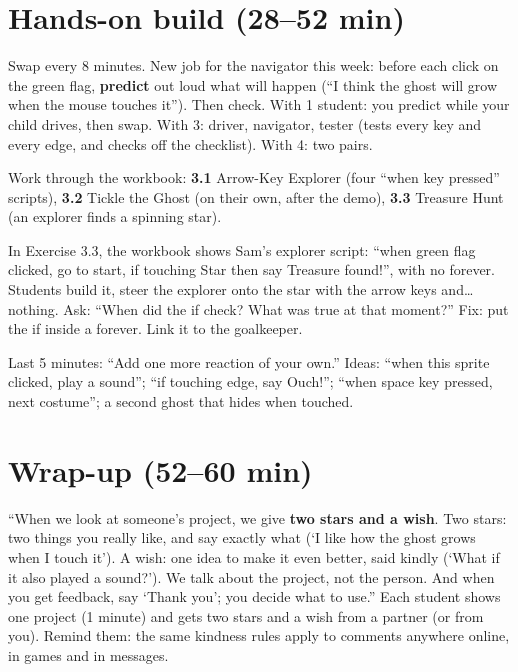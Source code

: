 \section{Hands-on build (28--52 min)}
\begin{pairroles}
Swap every 8 minutes. New job for the navigator this week: before each click on the green flag, \textbf{predict} out loud what will happen (\enquote{I think the ghost will grow when the mouse touches it}). Then check. With 1 student: you predict while your child drives, then swap. With 3: driver, navigator, tester (tests every key and every edge, and checks off the checklist). With 4: two pairs.
\end{pairroles}

Work through the workbook: \textbf{3.1} Arrow-Key Explorer (four \enquote{when key pressed} scripts), \textbf{3.2} Tickle the Ghost (on their own, after the demo), \textbf{3.3} Treasure Hunt (an explorer finds a spinning star).

\begin{bughunt}
In Exercise 3.3, the workbook shows Sam's explorer script: \enquote{when green flag clicked, go to start, if touching Star then say Treasure found!}, with no forever. Students build it, steer the explorer onto the star with the arrow keys and\ldots{} nothing. Ask: \enquote{When did the if check? What was true at that moment?} Fix: put the if inside a forever. Link it to the goalkeeper.
\end{bughunt}

\begin{freebuild}
Last 5 minutes: \enquote{Add one more reaction of your own.} Ideas: \enquote{when this sprite clicked, play a sound}; \enquote{if touching edge, say Ouch!}; \enquote{when space key pressed, next costume}; a second ghost that hides when touched.
\end{freebuild}

\section{Wrap-up (52--60 min)}
\begin{safety}
\enquote{When we look at someone's project, we give \textbf{two stars and a wish}. Two stars: two things you really like, and say exactly what (\enquote{I like how the ghost grows when I touch it}). A wish: one idea to make it even better, said kindly (\enquote{What if it also played a sound?}). We talk about the project, not the person. And when you get feedback, say \enquote{Thank you}; you decide what to use.} Each student shows one project (1 minute) and gets two stars and a wish from a partner (or from you).
Remind them: the same kindness rules apply to comments anywhere online, in games and in messages.
\end{safety}

